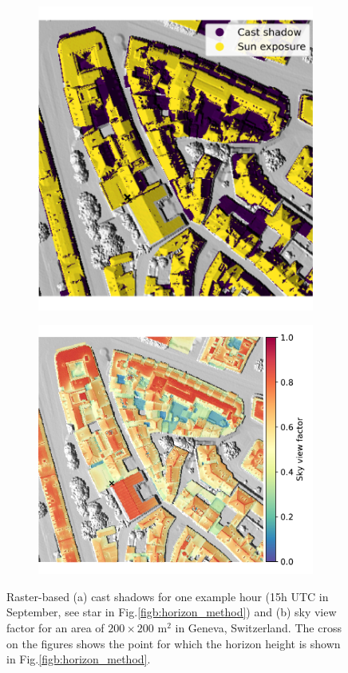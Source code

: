 \begin{figure}[tb!]
	\centering
	\begin{subfigure}{.49\textwidth}
		\centering
		\includegraphics[height=.9\linewidth]{images/Figs/demo_vis_09_15h_w_cross.pdf}  
		\subcaption{}
        	\label{figa:raster_svf_ssh}
	\end{subfigure}
	\begin{subfigure}{.49\textwidth}
		\centering
		\includegraphics[height=.9\linewidth]{images/Figs/svf_w_legend.pdf}  
		\subcaption{}
        	\label{figb:raster_svf_ssh}
	\end{subfigure}
	\caption{Raster-based (a) cast shadows for one example hour (15h UTC in September, see star in Fig.\ref{figb:horizon_method}) and (b) sky view factor for an area of $200\times200$ m$^2$ in Geneva, Switzerland. The cross on the figures shows the point for which the horizon height is shown in Fig.\ref{figb:horizon_method}.}
	\label{fig:raster_svf_ssh}
\end{figure}


